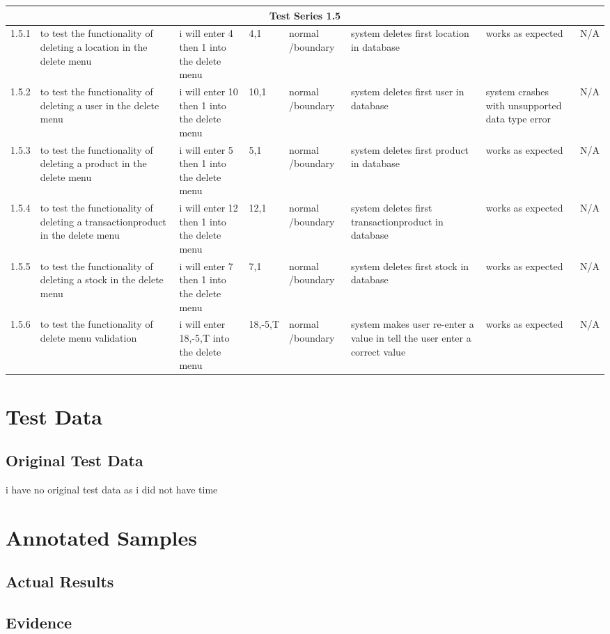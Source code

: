 \begin{landscape}
\begin{center}
\begin{longtable}{|p{1.5cm}|p{2.5cm}|p{2.5cm}|p{2cm}|p{2cm}|p{2cm}|p{2cm}|p{2cm}|}
\multicolumn{8}{c}{Test Series 1.5}\\ \hline
1.5.1 & to test the functionality of deleting a location in the delete menu & i will enter 4 then 1 into the delete menu & 4,1 & normal /boundary & system deletes first location in database & works as expected & N/A \\ \hline
1.5.2 & to test the functionality of deleting a user in the delete menu & i will enter 10 then 1 into the delete menu & 10,1 & normal /boundary & system deletes first user in database & system crashes with unsupported data type error & N/A \\ \hline
1.5.3 & to test the functionality of deleting a product in the delete menu & i will enter 5 then 1 into the delete menu & 5,1 & normal /boundary & system deletes first product in database & works as expected & N/A \\ \hline
1.5.4 & to test the functionality of deleting a transactionproduct in the delete menu & i will enter 12 then 1 into the delete menu & 12,1 & normal /boundary & system deletes first transactionproduct in database & works as expected & N/A \\ \hline
1.5.5 & to test the functionality of deleting a stock in the delete menu & i will enter 7 then 1 into the delete menu & 7,1 & normal /boundary & system deletes first stock in database & works as expected & N/A \\ \hline
1.5.6 & to test the functionality of delete menu validation & i will enter 18,-5,T into the delete menu & 18,-5,T & normal /boundary & system makes user re-enter a value in tell the user enter a correct value & works as expected & N/A \\ \hline


    \end{longtable}
\end{center}

\section{Test Data}

\subsection{Original Test Data}
i have no original test data as i did not have time 
\section{Annotated Samples}

\subsection{Actual Results}

\subsection{Evidence}

\end{landscape}

